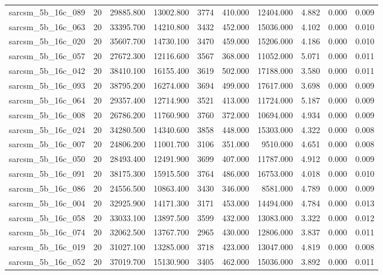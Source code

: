 \begin{tabular}{lrrrrrrrrr}
sarcsm\_5b\_16c\_089 & 20 & 29885.800 & 13002.800 & 3774 & 410.000 & 12404.000 & 4.882 & 0.000 & 0.009 \\
sarcsm\_5b\_16c\_063 & 20 & 33395.700 & 14210.800 & 3432 & 452.000 & 15036.000 & 4.102 & 0.000 & 0.010 \\
sarcsm\_5b\_16c\_020 & 20 & 35607.700 & 14730.100 & 3470 & 459.000 & 15206.000 & 4.186 & 0.000 & 0.010 \\
sarcsm\_5b\_16c\_057 & 20 & 27672.300 & 12116.600 & 3567 & 368.000 & 11052.000 & 5.071 & 0.000 & 0.011 \\
sarcsm\_5b\_16c\_042 & 20 & 38410.100 & 16155.400 & 3619 & 502.000 & 17188.000 & 3.580 & 0.000 & 0.011 \\
sarcsm\_5b\_16c\_093 & 20 & 38795.200 & 16274.000 & 3694 & 499.000 & 17617.000 & 3.698 & 0.000 & 0.009 \\
sarcsm\_5b\_16c\_064 & 20 & 29357.400 & 12714.900 & 3521 & 413.000 & 11724.000 & 5.187 & 0.000 & 0.009 \\
sarcsm\_5b\_16c\_008 & 20 & 26786.200 & 11760.900 & 3760 & 372.000 & 10694.000 & 4.934 & 0.000 & 0.009 \\
sarcsm\_5b\_16c\_024 & 20 & 34280.500 & 14340.600 & 3858 & 448.000 & 15303.000 & 4.322 & 0.000 & 0.008 \\
sarcsm\_5b\_16c\_007 & 20 & 24806.200 & 11001.700 & 3106 & 351.000 & 9510.000 & 4.651 & 0.000 & 0.008 \\
sarcsm\_5b\_16c\_050 & 20 & 28493.400 & 12491.900 & 3699 & 407.000 & 11787.000 & 4.912 & 0.000 & 0.009 \\
sarcsm\_5b\_16c\_091 & 20 & 38175.300 & 15915.500 & 3764 & 486.000 & 16753.000 & 4.018 & 0.000 & 0.010 \\
sarcsm\_5b\_16c\_086 & 20 & 24556.500 & 10863.400 & 3430 & 346.000 & 8581.000 & 4.789 & 0.000 & 0.009 \\
sarcsm\_5b\_16c\_004 & 20 & 32925.900 & 14171.300 & 3171 & 453.000 & 14494.000 & 4.784 & 0.000 & 0.013 \\
sarcsm\_5b\_16c\_058 & 20 & 33033.100 & 13897.500 & 3599 & 432.000 & 13083.000 & 3.322 & 0.000 & 0.012 \\
sarcsm\_5b\_16c\_074 & 20 & 32062.500 & 13767.700 & 2965 & 430.000 & 12806.000 & 3.837 & 0.000 & 0.011 \\
sarcsm\_5b\_16c\_019 & 20 & 31027.100 & 13285.000 & 3718 & 423.000 & 13047.000 & 4.819 & 0.000 & 0.008 \\
sarcsm\_5b\_16c\_052 & 20 & 37019.700 & 15130.900 & 3405 & 462.000 & 15036.000 & 3.892 & 0.000 & 0.011 \\

\end{tabular}
